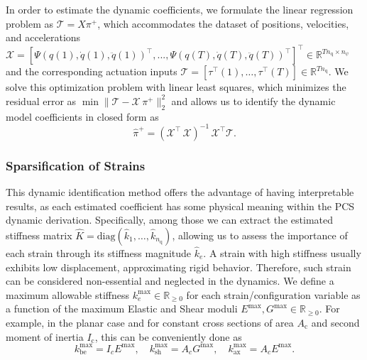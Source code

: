 In order to estimate the dynamic coefficients, we formulate the linear regression problem as $\mathcal{T}=X \pi^+$, which accommodates the dataset of positions, velocities, and accelerations 
$\mathcal{X} = [\Psi(q(1), \dot{q}(1), \ddot{q}(1))^{\top},...,\Psi(q(T), \dot{q}(T), \ddot{q}(T))^{\top}]^{\top} \in \mathbb{R}^{T n_\mathrm{q} \times n_{\psi}}$ 
and the corresponding actuation inputs 
$\mathcal{T}=[\tau^{\top}(1), \dots,\tau^{\top}(T)] \in \mathbb{R}^{T n_\mathrm{q}}$. 
We solve this optimization problem with linear least squares, which minimizes the residual error as $\min \lVert \mathcal{T} - \mathcal{X} \, \pi^+ \rVert_2^2$ and allows us to identify the dynamic model coefficients in closed form as
\begin{equation}
    \hat{\pi}^+ = (\mathcal{X}^{\top} \, \mathcal{X})^{-1} \, \mathcal{X}^{\top} \mathcal{T}.
\end{equation}

\subsubsection{Sparsification of Strains}\label{ssub:pcsregression:strain_spars}
This dynamic identification method offers the advantage of having interpretable results, as each estimated coefficient has some physical meaning within the \gls{PCS} dynamic derivation. Specifically, among those we can extract the estimated stiffness matrix $\hat{K} = \mathrm{diag}(\hat{k}_1, \dots, \hat{k}_{n_\mathrm{q}})$, allowing us to assess the importance of each strain through its stiffness magnitude $\hat{k}_e$. A strain with high stiffness usually exhibits low displacement, approximating rigid behavior. Therefore, such strain can be considered non-essential and neglected in the dynamics.
We define a maximum allowable stiffness $k^\mathrm{max}_e \in \mathbb{R}_{\geq0}$ for each strain/configuration variable as a function of the maximum Elastic and Shear moduli $E^{\text{max}}, G^{\text{max}} \in \mathbb{R}_{\geq 0}$. For example, in the planar case and for constant cross sections of area $A_\mathrm{c}$ and second moment of inertia $I_\mathrm{c}$, this can be conveniently done as
\begin{equation}
    k_{\mathrm{be}}^{\mathrm{max}} = I_c E^{\mathrm{max}},
    \quad
    k_{\text{sh}}^{\text{max}} = A_c G^{\mathrm{max}},
    \quad
    k_{\text{ax}}^{\text{max}} = A_c E^{\text{max}}.
\end{equation}

